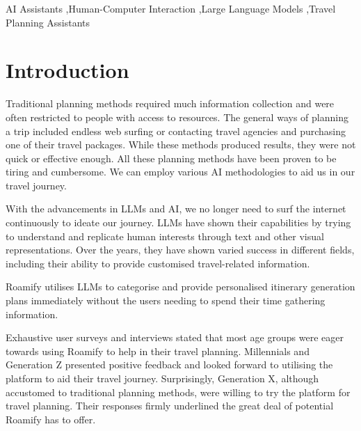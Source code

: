 \documentclass[final,3p,times,authoryear]{elsarticle}
\begin{document}
\begin{frontmatter}
\begin{keyword}
AI Assistants \sep Human-Computer Interaction \sep Large Language Models \sep Travel Planning Assistants
\end{keyword}

\end{frontmatter}







\section{Introduction}
    Traditional planning methods required much information collection and were often restricted to people with access to resources. The general ways of planning a trip included endless web surfing or contacting travel agencies and purchasing one of their travel packages. While these methods produced results, they were not quick or effective enough. All these planning methods have been proven to be tiring and cumbersome. We can employ various AI methodologies to aid us in our travel journey\cite{intro1}.
    
    With the advancements in LLMs and AI, we no longer need to surf the internet continuously to ideate our journey. LLMs have shown their capabilities by trying to understand and replicate human interests through text and other visual representations\cite{intro2}. Over the years, they have shown varied success in different fields, including their ability to provide customised travel-related information.
    
    Roamify utilises LLMs to categorise and provide personalised itinerary generation plans immediately without the users needing to spend their time gathering information.
    
    Exhaustive user surveys and interviews stated that most age groups were eager towards using Roamify to help in their travel planning. Millennials and Generation Z presented positive feedback and looked forward to utilising the platform to aid their travel journey. Surprisingly, Generation X, although accustomed to traditional planning methods, were willing to try the platform for travel planning. Their responses firmly underlined the great deal of potential Roamify has to offer.
    
\end{document}

